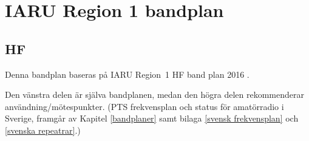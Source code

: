 \onecolumn

\chapter{IARU Region 1 bandplan}
\label{IARU bandplan}

\section{HF}
\label{HFbandplan}

Denna bandplan baseras på IARU Region~1 HF band plan 2016 \cite{IARU1}.

Den vänstra delen är själva bandplanen, medan den högra delen rekommenderar
användning/mötespunkter.
(PTS frekvensplan och status för amatörradio i Sverige, framgår av Kapitel
\ref{bandplaner} samt bilaga \ref{svensk frekvensplan} och
\ref{svenska repeatrar}.)


